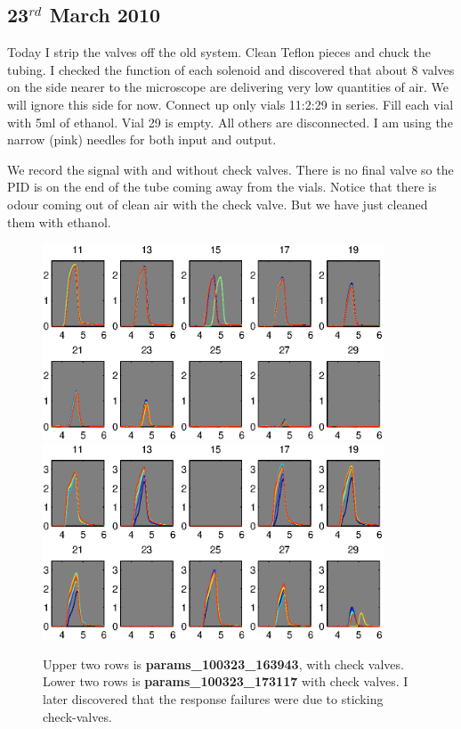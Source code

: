 \documentclass[a4paper]{report}
\begin{document}
\clearpage
\subsection{23$^{rd}$ March 2010}
Today I strip the valves off the old system. Clean Teflon pieces and
chuck the tubing. I checked the function of each solenoid and
discovered that about 8 valves on the side nearer to the microscope
are delivering very low quantities of air. We will ignore this side
for now. Connect up only vials 11:2:29 in series. Fill each vial with
5ml of ethanol. Vial 29 is empty. All others are disconnected. I am
using the narrow (pink) needles for both input and output. 

We record the signal with and without check valves. There is no final
valve so the PID is on the end of the tube coming away from the
vials. Notice that there is odour coming out of clean air with the
check valve. But we have just cleaned them with ethanol.

\begin{figure}[h]
\centering
\includegraphics[width=4in]{params_100323_163943.eps}
\includegraphics[width=4in]{params_100323_173117.eps}
\caption{Upper two rows is \textbf{params\_100323\_163943}, with check
  valves. Lower two rows is \textbf{params\_100323\_173117} with check
  valves. I later discovered that the response failures were due to
  sticking check-valves.}
\label{fig:one}
\end{figure}
\end{document}
